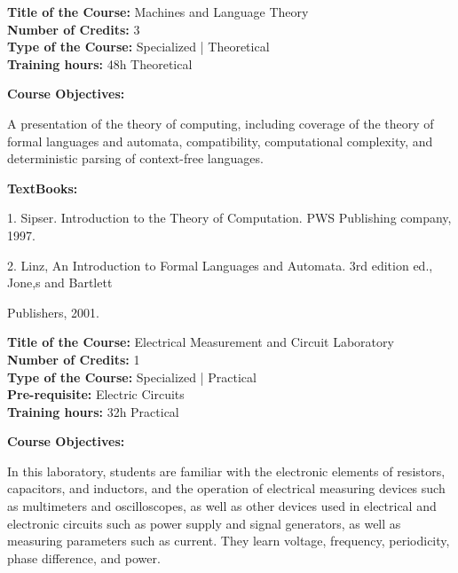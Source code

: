 \documentclass[12pt,a4paper]{article}
\begin{document}
\newpage
\textbf{Title of the Course:} Machines and Language Theory\\
\textbf{Number of Credits:} 3\\
\textbf{Type of the Course:} Specialized | Theoretical\\
\textbf{Training hours:} 48h Theoretical\par\vspace{4pt}
\textbf{Course Objectives:}\par\vspace{2pt}
A presentation of the theory of computing, including coverage of the theory of formal languages
and automata, compatibility, computational complexity, and deterministic parsing of context-free
languages.\par\vspace{4pt}
\textbf{TextBooks:}\par\vspace{2pt}
1. Sipser. Introduction to the Theory of Computation. PWS Publishing company, 1997.\par
2. Linz, An Introduction to Formal Languages and Automata. 3rd edition ed., Jone,s and Bartlett\par
Publishers, 2001.\par
\vspace{4pt}

\newpage
\textbf{Title of the Course:} Electrical Measurement and Circuit Laboratory\\
\textbf{Number of Credits:} 1\\
\textbf{Type of the Course:} Specialized | Practical\\
\textbf{Pre-requisite:} Electric Circuits\\
\textbf{Training hours:} 32h Practical\par\vspace{4pt}
\textbf{Course Objectives:}\par\vspace{2pt}
In this laboratory, students are familiar with the electronic elements of resistors, capacitors, and
inductors, and the operation of electrical measuring devices such as multimeters and oscilloscopes,
as well as other devices used in electrical and electronic circuits such as power supply and signal
generators, as well as measuring parameters such as current. They learn voltage, frequency,
periodicity, phase difference, and power.\par\vspace{4pt}
\end{document}
